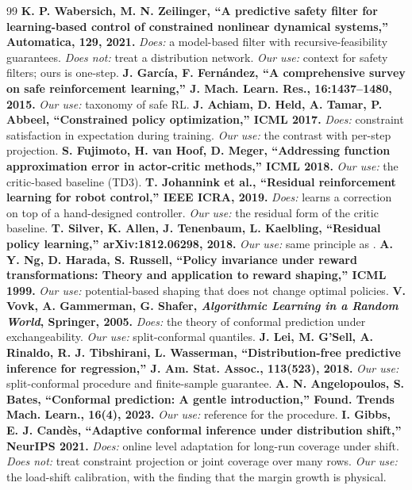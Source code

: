 \documentclass[11pt]{article}
\begin{document}
\begin{thebibliography}{99}
\textbf{K. P. Wabersich, M. N. Zeilinger, ``A predictive safety filter for learning-based control of constrained nonlinear dynamical systems,'' Automatica, 129, 2021.} \emph{Does:} a model-based filter with recursive-feasibility guarantees. \emph{Does not:} treat a distribution network. \emph{Our use:} context for safety filters; ours is one-step.
\textbf{J. Garc\'ia, F. Fern\'andez, ``A comprehensive survey on safe reinforcement learning,'' J. Mach. Learn. Res., 16:1437--1480, 2015.} \emph{Our use:} taxonomy of safe RL.
\textbf{J. Achiam, D. Held, A. Tamar, P. Abbeel, ``Constrained policy optimization,'' ICML 2017.} \emph{Does:} constraint satisfaction in expectation during training. \emph{Our use:} the contrast with per-step projection.
\textbf{S. Fujimoto, H. van Hoof, D. Meger, ``Addressing function approximation error in actor-critic methods,'' ICML 2018.} \emph{Our use:} the critic-based baseline (TD3).
\textbf{T. Johannink et al., ``Residual reinforcement learning for robot control,'' IEEE ICRA, 2019.} \emph{Does:} learns a correction on top of a hand-designed controller. \emph{Our use:} the residual form of the critic baseline.
\textbf{T. Silver, K. Allen, J. Tenenbaum, L. Kaelbling, ``Residual policy learning,'' arXiv:1812.06298, 2018.} \emph{Our use:} same principle as \cite{johannink}.
\textbf{A. Y. Ng, D. Harada, S. Russell, ``Policy invariance under reward transformations: Theory and application to reward shaping,'' ICML 1999.} \emph{Our use:} potential-based shaping that does not change optimal policies.
\textbf{V. Vovk, A. Gammerman, G. Shafer, \emph{Algorithmic Learning in a Random World}, Springer, 2005.} \emph{Does:} the theory of conformal prediction under exchangeability. \emph{Our use:} split-conformal quantiles.
\textbf{J. Lei, M. G'Sell, A. Rinaldo, R. J. Tibshirani, L. Wasserman, ``Distribution-free predictive inference for regression,'' J. Am. Stat. Assoc., 113(523), 2018.} \emph{Our use:} split-conformal procedure and finite-sample guarantee.
\textbf{A. N. Angelopoulos, S. Bates, ``Conformal prediction: A gentle introduction,'' Found. Trends Mach. Learn., 16(4), 2023.} \emph{Our use:} reference for the procedure.
\textbf{I. Gibbs, E. J. Cand\`es, ``Adaptive conformal inference under distribution shift,'' NeurIPS 2021.} \emph{Does:} online level adaptation for long-run coverage under shift. \emph{Does not:} treat constraint projection or joint coverage over many rows. \emph{Our use:} the load-shift calibration, with the finding that the margin growth is physical.

\end{thebibliography}
\end{document}
